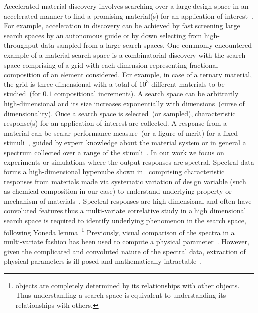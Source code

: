Accelerated material discovery involves searching over a large design space in an accelerated manner to find a promising material(s) for an application of interest~\cite{rajan2013informatics,ajayi2016rapid}.
For example, acceleration in discovery can be achieved by fast screening large search spaces by an autonomous guide or by down selecting from high-throughput data sampled from a large search spaces. 
One commonly encountered example of a material search space is a combinatorial discovery with the search space comprising of a grid with each dimension representing fractional composition of an element considered.
For example, in case of a ternary material, the grid is three dimensional with a total of \(10^3\) different materials to be studied~(for \(0.1\) compositional increments). 
A search space can be arbitrarily high-dimensional and its size increases exponentially with dimensions~(curse of dimensionality). 
Once a search space is selected~(or sampled), characteristic response(s) for an application of interest are collected. 
A response from a material can be scalar performance measure~(or a figure of merit) for a fixed stimuli~\cite{haber2014high,suram2015generating}, guided by expert knowledge about the material system or in general a spectrum collected over a range of the stimuli~\cite{hattrick2016perspective}. 
In our work we focus on experiments or simulations where the output responses are spectral.
Spectral data forms a high-dimensional hypercube shown in~ comprising characteristic responses from materials made via systematic variation of design variable (such as chemical composition in our case) to understand underlying property or mechanism of materials~\cite{rajan2013informatics}.
Spectral responses are high dimensional and often have convoluted features thus a multi-variate correlative study in a high dimensional search space is required to identify underlying phenomenon in the search space, following Yoneda lemma~\footnote{objects are completely determined by its relationships with other objects. Thus understanding a search space is equivalent to understanding its relationships with others.} 
Previously, visual comparison of the spectra in a multi-variate fashion has been used to compute a physical parameter~\cite{de2008core,de19902p}. 
However, given the complicated and convoluted nature of the spectral data, extraction of physical parameters is ill-posed and mathematically intractable~\cite{suzuki2019automated}. 

